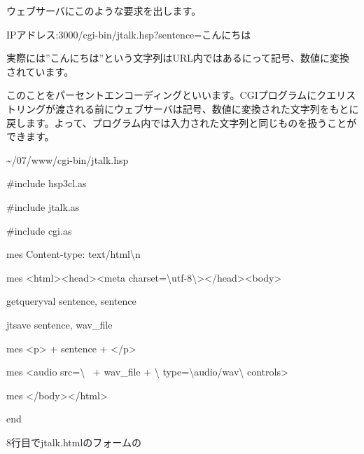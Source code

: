 \documentclass[a4paper,12pt,dvipdfmx]{jarticle}
\begin{document}
ウェブサーバにこのような要求を出します。

IPアドレス:3000/cgi-bin/jtalk.hsp?sentence=こんにちは

実際には”こんにちは”という文字列はURL内ではあるにって記号、数値に変換されています。

このことをパーセントエンコーディングといいます。CGIプログラムにクエリストリングが渡される前にウェブサーバは記号、数値に変換された文字列をもとに戻します。よって、プログラム内では入力された文字列と同じものを扱うことができます。

{\textasciitilde}/07/www/cgi-bin/jtalk.hsp

\centering
\begin{boxedminipage}{\textwidth}
	\#include {\textquotedbl}hsp3cl.as{\textquotedbl}

	\#include {\textquotedbl}jtalk.as{\textquotedbl}

	\#include {\textquotedbl}cgi.as{\textquotedbl}


	\bigskip

	mes {\textquotedbl}Content-type: text/html{\textbackslash}n{\textquotedbl}

	mes {\textquotedbl}{\textless}html{\textgreater}{\textless}head{\textgreater}{\textless}meta
	charset={\textbackslash}{\textquotedbl}utf-8{\textbackslash}{\textquotedbl}{\textgreater}{\textless}/head{\textgreater}{\textless}body{\textgreater}{\textquotedbl}


	\bigskip

	getqueryval {\textquotedbl}sentence{\textquotedbl}, sentence

	jtsave sentence, wav\_file

	mes {\textquotedbl}{\textless}p{\textgreater}{\textquotedbl} + sentence +
	{\textquotedbl}{\textless}/p{\textgreater}{\textquotedbl}


	\bigskip

	mes {\textquotedbl}{\textless}audio src={\textbackslash}{\textquotedbl}{\textquotedbl} \ + wav\_file +
	{\textquotedbl}{\textbackslash}{\textquotedbl}
	type={\textbackslash}{\textquotedbl}audio/wav{\textbackslash}{\textquotedbl} controls{\textgreater}{\textquotedbl}

	mes {\textquotedbl}{\textless}/body{\textgreater}{\textless}/html{\textgreater}{\textquotedbl}

	end
\end{boxedminipage}
\flushleft

\bigskip

8行目でjtalk.htmlのフォームの
\end{document}
